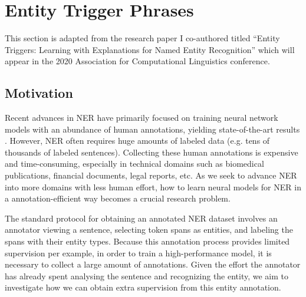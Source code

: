 \chapter{Entity Trigger Phrases}
This section is adapted from the research paper I co-authored titled ``Entity Triggers: Learning with Explanations for Named Entity Recognition'' which will appear in the 2020 Association for Computational Linguistics conference.



\section{Motivation}
\label{sec:intro}
Recent advances in NER have primarily focused on training neural network models with an abundance of human annotations, yielding state-of-the-art results \citep{LampleNER}. However, NER often requires huge amounts of labeled data (e.g. tens of thousands of labeled sentences). Collecting these human annotations is expensive and time-consuming, especially in technical domains such as biomedical publications, financial documents, legal reports, etc. As we seek to advance NER into more domains with less human effort, how to learn neural models for NER in a annotation-efficient way becomes a crucial research problem.

The standard protocol for obtaining an annotated NER dataset involves an annotator viewing a sentence, selecting token spans as entities, and labeling the spans with their entity types. Because this annotation process provides limited supervision per example, in order to train a high-performance model, it is necessary to collect a large amount of annotations. Given the effort the annotator has already spent analysing the sentence and recognizing the entity, we aim to investigate how we can obtain extra supervision from this entity annotation.

